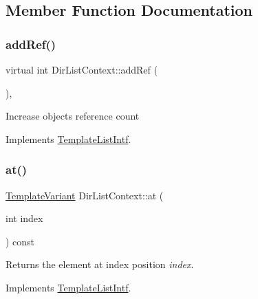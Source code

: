 \subsection{Member Function Documentation}
\mbox{\label{class_dir_list_context_abdf1dfce3d1e7693c50080226603e121}} 
\subsubsection{\texorpdfstring{addRef()}{addRef()}}
{\footnotesize\ttfamily virtual int Dir\+List\+Context\+::add\+Ref (\begin{DoxyParamCaption}{ }\end{DoxyParamCaption})\hspace{0.3cm}{\ttfamily [inline]}, {\ttfamily [virtual]}}

Increase object\textquotesingle{}s reference count 

Implements \mbox{\hyperlink{class_template_list_intf_a4b4973e2e15396d10bc4e3085462ca2b}{Template\+List\+Intf}}.

\mbox{\label{class_dir_list_context_a945ceb92b9e8b4f8a825f283d577eef0}} 
\subsubsection{\texorpdfstring{at()}{at()}}
{\footnotesize\ttfamily \mbox{\hyperlink{class_template_variant}{Template\+Variant}} Dir\+List\+Context\+::at (\begin{DoxyParamCaption}\item[{int}]{index }\end{DoxyParamCaption}) const\hspace{0.3cm}{\ttfamily [virtual]}}

Returns the element at index position {\itshape index}. 

Implements \mbox{\hyperlink{class_template_list_intf_aa51e57e72eacf4e8ce1055ee30a0f7f8}{Template\+List\+Intf}}.

\mbox{\label{class_dir_list_context_ac8c79425ffe533916c0e388e49ebbfb6}} 
